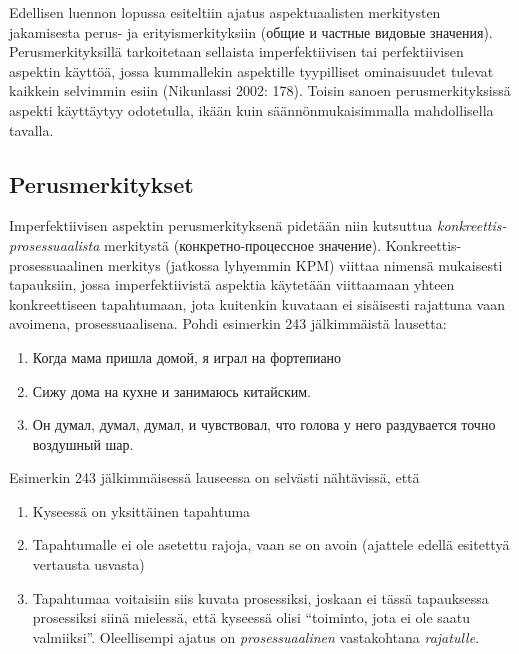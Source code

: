 \documentclass[]{scrartcl}
\providecommand{\tightlist}{%
  \setlength{\itemsep}{0pt}\setlength{\parskip}{0pt}}
\begin{document}
Edellisen luennon lopussa esiteltiin ajatus aspektuaalisten merkitysten
jakamisesta perus- ja erityismerkityksiin (общие и частные видовые
значения). Perusmerkityksillä tarkoitetaan sellaista imperfektiivisen
tai perfektiivisen aspektin käyttöä, jossa kummallekin aspektille
tyypilliset ominaisuudet tulevat kaikkein selvimmin esiin (Nikunlassi
2002: 178). Toisin sanoen perusmerkityksissä aspekti käyttäytyy
odotetulla, ikään kuin säännönmukaisimmalla mahdollisella tavalla.

\subsection{Perusmerkitykset}\label{perusmerkitykset}

Imperfektiivisen aspektin perusmerkityksenä pidetään niin kutsuttua
\emph{konkreettis-prosessuaalista} merkitystä (конкретно-процессное
значение). Konkreettis-prosessuaalinen merkitys (jatkossa lyhyemmin KPM)
viittaa nimensä mukaisesti tapauksiin, jossa imperfektiivistä aspektia
käytetään viittaamaan yhteen konkreettiseen tapahtumaan, jota kuitenkin
kuvataan ei sisäisesti rajattuna vaan avoimena, prosessuaalisena. Pohdi
esimerkin 243 jälkimmäistä lausetta:

\begin{enumerate}
\def\labelenumi{(\arabic{enumi})}
\setcounter{enumi}{242}
\tightlist
\item
  Когда мама пришла домой, я играл на фортепиано
\item
  Сижу дома на кухне и занимаюсь китайским.
\item
  Он думал, думал, думал, и чувствовал, что голова у него раздувается
  точно воздушный шар.
\end{enumerate}

Esimerkin 243 jälkimmäisessä lauseessa on selvästi nähtävissä, että

\begin{enumerate}
\def\labelenumi{\arabic{enumi}.}
\tightlist
\item
  Kyseessä on yksittäinen tapahtuma
\item
  Tapahtumalle ei ole asetettu rajoja, vaan se on avoin (ajattele edellä
  esitettyä vertausta usvasta)
\item
  Tapahtumaa voitaisiin siis kuvata prosessiksi, joskaan ei tässä
  tapauksessa prosessiksi siinä mielessä, että kyseessä olisi
  ``toiminto, jota ei ole saatu valmiiksi''. Oleellisempi ajatus on
  \emph{prosessuaalinen} vastakohtana \emph{rajatulle}.
\end{enumerate}
\end{document}
